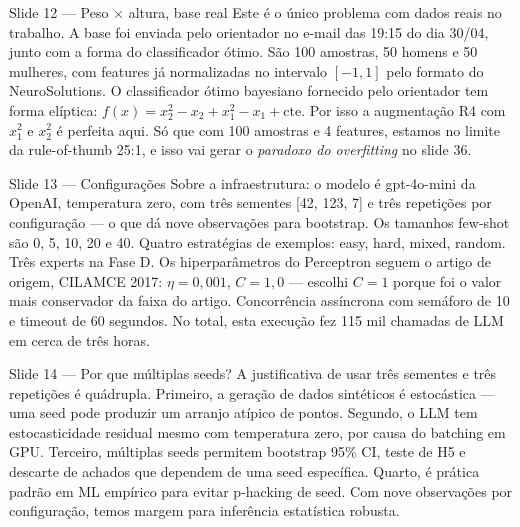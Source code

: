 \documentclass[aspectratio=169,10pt]{beamer}
\begin{document}
\begin{frame}{Slide 12 --- Peso $\times$ altura, base real}
\footnotesize
Este \'e o \'unico problema com dados reais no trabalho. A base foi enviada pelo orientador no e-mail das 19:15 do dia 30/04, junto com a forma do classificador \'otimo. S\~ao 100 amostras, 50 homens e 50 mulheres, com features j\'a normalizadas no intervalo $[-1, 1]$ pelo formato do NeuroSolutions. O classificador \'otimo bayesiano fornecido pelo orientador tem forma el\'iptica: $f(x) = x_2^2 - x_2 + x_1^2 - x_1 + \text{cte}$. Por isso a augmenta\c{c}\~ao R4 com $x_1^2$ e $x_2^2$ \'e perfeita aqui. S\'o que com 100 amostras e 4 features, estamos no limite da rule-of-thumb 25:1, e isso vai gerar o \emph{paradoxo do overfitting} no slide 36.
\end{frame}

\begin{frame}{Slide 13 --- Configura\c{c}\~oes}
\footnotesize
Sobre a infraestrutura: o modelo \'e gpt-4o-mini da OpenAI, temperatura zero, com tr\^es sementes [42, 123, 7] e tr\^es repeti\c{c}\~oes por configura\c{c}\~ao --- o que d\'a nove observa\c{c}\~oes para bootstrap. Os tamanhos few-shot s\~ao 0, 5, 10, 20 e 40. Quatro estrat\'egias de exemplos: easy, hard, mixed, random. Tr\^es experts na Fase D. Os hiperpar\^ametros do Perceptron seguem o artigo de origem, CILAMCE 2017: $\eta = 0{,}001$, $C = 1{,}0$ --- escolhi $C=1$ porque foi o valor mais conservador da faixa do artigo. Concorr\^encia ass\'incrona com sem\'aforo de 10 e timeout de 60 segundos. No total, esta execu\c{c}\~ao fez 115 mil chamadas de LLM em cerca de tr\^es horas.
\end{frame}

\begin{frame}{Slide 14 --- Por que m\'ultiplas seeds?}
\footnotesize
A justificativa de usar tr\^es sementes e tr\^es repeti\c{c}\~oes \'e qu\'adrupla. Primeiro, a gera\c{c}\~ao de dados sint\'eticos \'e estoc\'astica --- uma seed pode produzir um arranjo at\'ipico de pontos. Segundo, o LLM tem estocasticidade residual mesmo com temperatura zero, por causa do batching em GPU. Terceiro, m\'ultiplas seeds permitem bootstrap 95\% CI, teste de H5 e descarte de achados que dependem de uma seed espec\'ifica. Quarto, \'e pr\'atica padr\~ao em ML emp\'irico para evitar p-hacking de seed. Com nove observa\c{c}\~oes por configura\c{c}\~ao, temos margem para infer\^encia estat\'istica robusta.
\end{frame}
\end{document}
